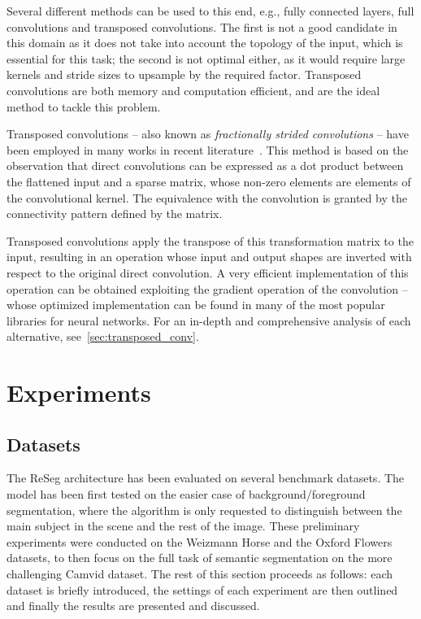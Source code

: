Several different methods can be used to this end, e.g., fully connected
layers, full convolutions and transposed convolutions. The first is not a good
candidate in this domain as it does not take into account the topology of the
input, which is essential for this task; the second is not optimal either, as
it would require large kernels and stride sizes to upsample by the required
factor. Transposed convolutions are both memory and computation efficient, and
are the ideal method to tackle this problem.

Transposed convolutions -- also known as \emph{fractionally strided
convolutions} -- have been employed in many works in recent
literature~\cite{Zeiler-ICCV2011,ZeilerFergus14,long2015fully,
radford2015unsupervised,im2016generating}. This method is based on the
observation that direct convolutions can be expressed as a dot product between
the flattened input and a sparse matrix, whose non-zero elements are elements
of the convolutional kernel. The equivalence with the convolution is granted by
the connectivity pattern defined by the matrix.

Transposed convolutions apply the transpose of this transformation matrix to
the input, resulting in an operation whose input and output shapes are inverted
with respect to the original direct convolution. A very efficient
implementation of this operation can be obtained exploiting the gradient
operation of the convolution -- whose optimized implementation can be found in
many of the most popular libraries for neural networks. For an in-depth and
comprehensive analysis of each alternative,
see~\autoref{sec:transposed_conv}.


\section{Experiments}\label{sec:reseg_experiments}

\subsection{Datasets}

The ReSeg architecture has been evaluated on several benchmark datasets. The
model has been first tested on the easier case of background/foreground
segmentation, where the algorithm is only requested to distinguish between the
main subject in the scene and the rest of the image. These preliminary
experiments were conducted on the Weizmann Horse and the Oxford Flowers
datasets, to then focus on the full task of semantic segmentation on the more
challenging Camvid dataset. The rest of this section proceeds as follows: each
dataset is briefly introduced, the settings of each experiment are then
outlined and finally the results are presented and discussed.

